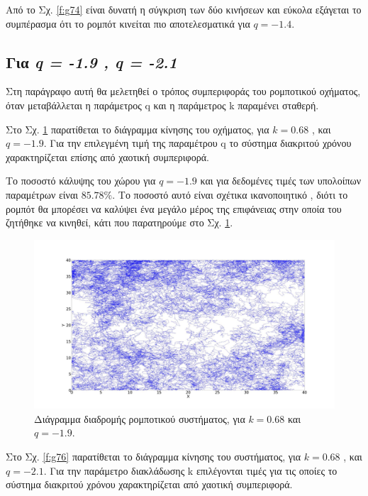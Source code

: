 Από το Σχ. \ref{f:g74} είναι δυνατή η σύγκριση των δύο κινήσεων και εύκολα εξάγεται το
συμπέρασμα ότι το ρομπότ κινείται πιο αποτελεσματικά για $q = -1.4$.

\clearpage

\subsection{Για \emph{q = -1.9 , q = -2.1}}

Στη παράγραφο αυτή θα μελετηθεί ο τρόπος συμπεριφοράς του ρομποτικού οχήματος, όταν μεταβάλλεται η παράμετρος q και η παράμετρος k παραμένει σταθερή.

Στο Σχ. \ref{f:g75} παρατίθεται το διάγραμμα κίνησης του οχήματος, για $k=0.68$ , και $q = -1.9$. Για την επιλεγμένη τιμή της παραμέτρου q το σύστημα διακριτού χρόνου χαρακτηρίζεται επίσης από χαοτική συμπεριφορά.

Το ποσοστό κάλυψης του χώρου για $q = -1.9$ και για δεδομένες τιμές των υπολοίπων παραμέτρων είναι $85.78 \%$. Το ποσοστό αυτό είναι σχέτικα ικανοποιητικό , διότι το ρομπότ θα μπορέσει να καλύψει ένα μεγάλο μέρος της επιφάνειας στην οποία του ζητήθηκε να κινηθεί, κάτι που παρατηρούμε στο Σχ. \ref{f:g75}.


\begin{figure}[ht]
	\centering
	\includegraphics[width=1\linewidth]{LateX images/log/q/g2-1.9}
	\caption{Διάγραμμα διαδρομής ρομποτικού συστήματος, για $k = 0.68$ και $q = -1.9$.}
	\label{f:g75}	
\end{figure}

Στο Σχ. \ref{f:g76} παρατίθεται το διάγραμμα κίνησης του συστήματος, για $k=0.68$ , και $q = -2.1$. Για την παράμετρο διακλάδωσης k επιλέγονται τιμές για τις οποίες το σύστημα διακριτού χρόνου χαρακτηρίζεται από χαοτική συμπεριφορά.

